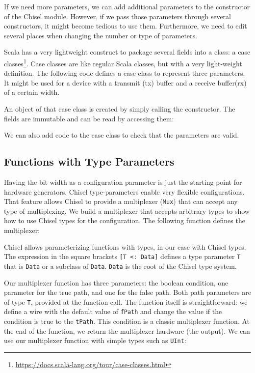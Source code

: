\documentclass[%
    10pt,
    headinclude, footexclude,
    openright, %
    notitlepage,
    cleardoubleempty,
    headsepline,
    pointlessnumbers,
    bibtotoc, idxtotoc,
    ]{scrbook}
\newcommand{\code}[1]{{\lstinline[basicstyle=\small\ttfamily]{#1}}}
\newcommand{\myref}[2]{\href{#1}{#2}}
\renewcommand{\myref}[2]{{#2}{\footnote{\url{#1}}}}
\begin{document}
If we need more parameters, we can add additional parameters to the constructor
of the Chisel module. However, if we pass those parameters through several constructors,
it might become tedious to use them. Furthermore, we need to edit several places when changing the number or type of
parameters.

Scala has a very lightweight construct to package several fields into a class:
a \myref{https://docs.scala-lang.org/tour/case-classes.html}{case classes}.
Case classes are like regular Scala classes, but with a very light-weight definition.
The following code defines a case class to represent three parameters. It might be used for
a device with a transmit (tx) buffer and a receive buffer(rx) of a certain width.


\noindent An object of that case class is created by simply calling the constructor.
The fields are immutable and can be read by accessing them:


\noindent We can also add code to the case class to check that the parameters
are valid.


\subsection{Functions with Type Parameters}

Having the bit width as a configuration parameter is just the starting point for
hardware generators. Chisel type-parameters enable very flexible configurations.
That feature allows Chisel to provide a multiplexer (\code{Mux}) that
can accept any type of multiplexing.
We build a multiplexer that accepts arbitrary types to show how to use Chisel
types for the configuration. The following function defines the multiplexer:


Chisel allows parameterizing functions with types, in our case with Chisel
types. The expression in the square brackets \code{[T <: Data]} defines
a type parameter \code{T} that is \code{Data} or a subclass of \code{Data}.
\code{Data} is the root of the Chisel type system.

Our multiplexer function has three parameters: the boolean condition,
one parameter for the true path, and one for the false path.
Both path parameters are of type \code{T}, 
provided at the function call. The function itself is straightforward:
we define a wire with the default value of \code{fPath} and
change the value if the condition is true to the \code{tPath}.
This condition is a classic multiplexer function.
At the end of the function, we return the multiplexer hardware (the output).
We can use our multiplexer function with simple types such as
\code{UInt}:
\end{document}
